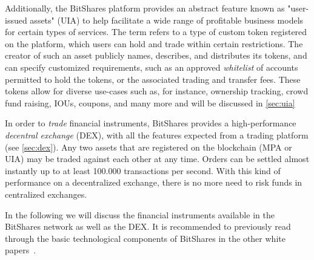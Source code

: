 Additionally, the BitShares platform provides an abstract feature known as
"user-issued assets" (UIA) to help facilitate a wide range of profitable
business models for certain types of services. The term refers to a type of
custom token registered on the platform, which users can hold and trade within
certain restrictions. The creator of such an asset publicly names, describes,
and distributes its tokens, and can specify customized requirements, such as an
approved \emph{whitelist} of accounts permitted to hold the tokens, or the
associated trading and transfer fees. These tokens allow for diverse use-cases
such as, for instance, ownership tracking, crowd fund raising, IOUs, coupons,
and many more and will be discussed in \cref{sec:uia}

In order to \emph{trade} financial instruments, BitShares provides a
high-performance \emph{decentral exchange} (DEX), with all the features
expected from a trading platform (see \cref{sec:dex}). Any two assets that are
registered on the blockchain (MPA or UIA) may be traded against each other at
any time. Orders can be settled almost instantly up to at least 100.000
transactions per second.  With this kind of performance on a decentralized
exchange, there is no more need to risk funds in centralized exchanges.


In the following we will discuss the financial instruments available in the
BitShares network as well as the DEX. It is recommended to previously read
through the basic technological components of BitShares in the other white
papers~\cite{bts:general,bts:growth,bts:structure}.

